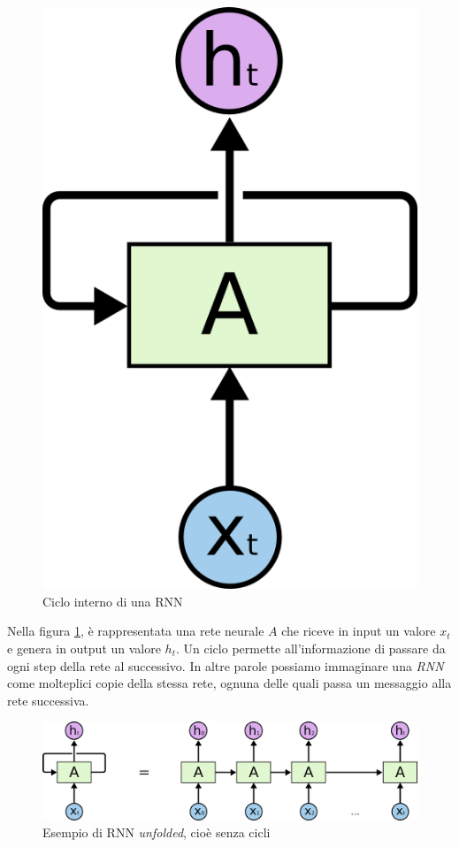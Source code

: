 \documentclass[a4paper,12pt,openright,twoside]{report}
\theoremstyle{definition}
\begin{document}
\begin{figure}[ht]
	\centering
	\includegraphics[scale=0.5]{Immagini/rnn1.png}
	\caption{Ciclo interno di una RNN}
	\label{fig:rnn1}
\end{figure}

Nella figura \ref{fig:rnn1}, è rappresentata una rete neurale $A$ che riceve in input un valore $x_t$ e genera in output un valore $h_t$.
Un ciclo permette all'informazione di passare da ogni step della rete al successivo. 
In altre parole possiamo immaginare
una \emph{RNN} come molteplici copie della stessa rete, ognuna delle quali passa un messaggio alla rete successiva.

\begin{figure}[ht]
	\centering
	\includegraphics[scale=0.3]{Immagini/rnn2.png}
	\caption{Esempio di RNN \emph{unfolded}, cioè senza cicli}
	\label{fig:rnn2}
\end{figure}
\end{document}
